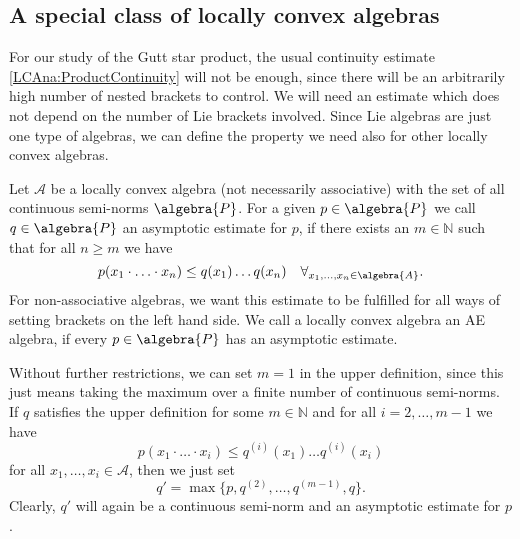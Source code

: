 \subsection{A special class of locally convex algebras}

For our study of the Gutt star product, the usual continuity estimate 
\eqref{LCAna:ProductContinuity} will not be enough, since 
there will be an arbitrarily high number of nested brackets to control. 
We will need an estimate which does not depend on the number of Lie 
brackets involved. Since Lie algebras are just one type of algebras, 
we can define the property we need also for other locally convex algebras. 
\begin{definition}
	\label{Def:AE}
	Let $\mathcal{A}$ be a locally convex algebra (not necessarily 
	associative) with the set of all continuous semi-norms $\algebra{P}$. 
	For a given $p \in \algebra{P}$ we call $q \in \algebra{P}$ an 
	asymptotic estimate for $p$, if there exists an $m \in \mathbb{N}$ 
	such that for all $n \geq m$ we have
	\begin{equation}
		\label{LCAna:AE}
		p(x_1 \cdot \ldots \cdot x_n)
		\leq
		q(x_1) \ldots q(x_n)
		\quad
		\forall_{x_1, \ldots, x_n \in \algebra{A}}.
	\end{equation}
	For non-associative algebras, we want this estimate to be fulfilled 
	for all ways of setting brackets on the left hand side.
	We call a locally convex algebra an AE algebra, if every $p \in 
	\algebra{P}$ has an asymptotic estimate.
\end{definition}
\begin{remark}
	\label{Rem:LCAna:AE1}
	Without further restrictions, we can set $m = 1$ in the upper definition, 
	since this just means taking the maximum over a finite number of 
	continuous semi-norms. If $q$ satisfies the upper definition for some $m 
	\in \mathbb{N}$ and for all $i = 2, \ldots, m-1$ we have
	\begin{equation*}
		p(x_1 \cdot \ldots \cdot x_i)
		\leq
		q^{(i)}(x_1) \ldots q^{(i)}(x_i)
	\end{equation*}
	for all $x_1, \ldots, x_i \in \mathcal{A}$, then we just set
	\begin{equation*}
		q'
		=
		\max\{ 
			p, q^{(2)}, \ldots, q^{(m-1)}, q
		\}.
	\end{equation*}
	Clearly, $q'$ will again be a continuous semi-norm and an asymptotic 
	estimate for $p$.
\end{remark}
